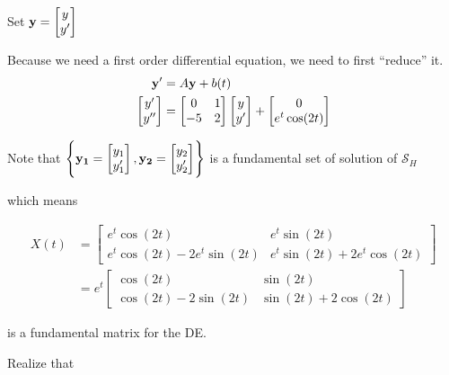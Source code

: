 	\begin{sol}
		Set $\bm{\mathrm{y}} = \begin{bmatrix}
			y\\y'
		\end{bmatrix}$

		Because we need a first order differential equation, we need to first ``reduce'' it.
		\begin{align}
			\bm{\mathrm{y}}' &= A \bm{\mathrm{y}} + b(t)\\
			\begin{bmatrix}
				y'\\y''
			\end{bmatrix} &= \begin{bmatrix}
				0&1\\-5&2
			\end{bmatrix} \begin{bmatrix}
				y\\y'
			\end{bmatrix} + \begin{bmatrix}
				0\\e^t\cos(2t)
			\end{bmatrix}
		\end{align}

		Note that $\left\{\bm{\mathrm{y_1}} = \begin{bmatrix}
			y_1\\y_1'
		\end{bmatrix}, \bm{\mathrm{y_2}} = \begin{bmatrix}
			y_2\\y_2'
		\end{bmatrix}
		\right\}$ is a fundamental set of solution of $\mathcal{S}_H$

		which means

		\begin{align}
			X(t) &= \begin{bmatrix}
				e^t\cos(2t) & e^t\sin(2t)\\
				e^t\cos(2t) - 2e^t\sin(2t) & e^t\sin(2t) + 2e^t\cos(2t)
			\end{bmatrix}\\
			&= e^t \begin{bmatrix}
				\cos(2t) & \sin(2t)\\
				\cos(2t) - 2\sin(2t) & \sin(2t) + 2\cos(2t)
			\end{bmatrix}
		\end{align}

		is a fundamental matrix for the DE.

		Realize that


\end{sol}
